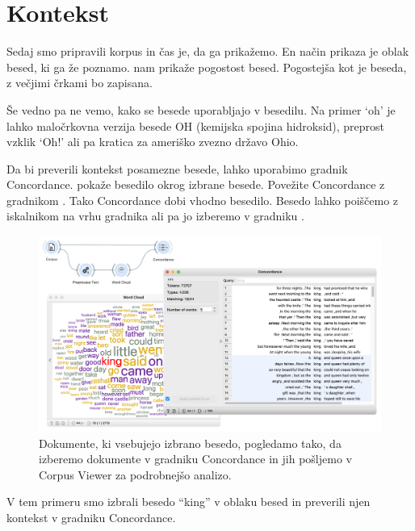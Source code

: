 \chapter{Kontekst}
\label{ch:kontekst}

Sedaj smo pripravili korpus in čas je, da ga prikažemo. En način prikaza je oblak besed, ki ga že poznamo.  nam prikaže pogostost besed. Pogostejša kot je beseda, z večjimi črkami bo zapisana.

Še vedno pa ne vemo, kako se besede uporabljajo v besedilu. Na primer ‘oh’ je lahko maločrkovna verzija besede OH (kemijska spojina hidroksid), preprost vzklik ‘Oh!’ ali pa kratica za ameriško zvezno državo Ohio.

Da bi preverili kontekst posamezne besede, lahko uporabimo gradnik Concordance.  pokaže besedilo okrog izbrane besede.
Povežite Concordance z gradnikom . Tako Concordance dobi vhodno besedilo. Besedo lahko poiščemo z iskalnikom na vrhu gradnika ali pa jo izberemo v gradniku .

\begin{figure}[h]
  \includegraphics[width=\linewidth]{kontekst.png}%
  \caption{Dokumente, ki vsebujejo izbrano besedo, pogledamo tako, da izberemo dokumente v gradniku Concordance in jih pošljemo v Corpus Viewer za podrobnejšo analizo.}
  \label{fig:003-kontekst}
\end{figure}

V tem primeru smo izbrali besedo ``king'' v oblaku besed in preverili njen kontekst v gradniku Concordance.